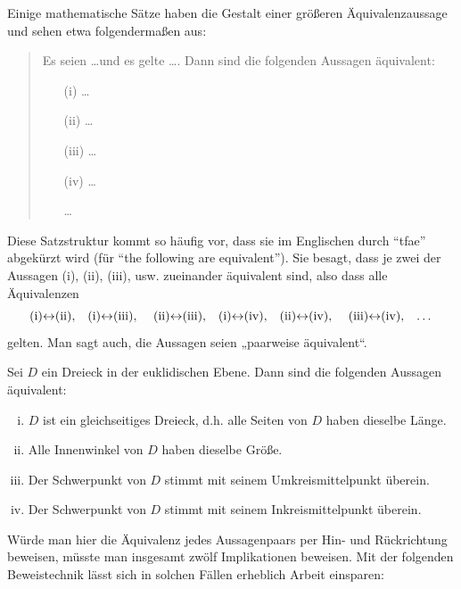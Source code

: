 \begin{de} \label{def:tfae}
    Einige mathematische Sätze haben die Gestalt einer größeren Äquivalenzaussage und sehen etwa folgendermaßen aus:
    \begin{quote}
        Es seien \dots und es gelte \dots. Dann sind die folgenden Aussagen äquivalent:
        \begin{itemize}
            \item[(i)] \dots
            \item[(ii)] \dots
            \item[(iii)] \dots
            \item[(iv)] \dots
            \item[\dots]
        \end{itemize}
    \end{quote}
    Diese Satzstruktur kommt so häufig vor, dass sie im Englischen durch ``tfae'' abgekürzt wird (für ``the following are equivalent''). Sie besagt, dass je zwei der Aussagen (i), (ii), (iii), usw. zueinander äquivalent sind, also dass alle Äquivalenzen
        \[ \text{(i)$\leftrightarrow$(ii),\quad (i)$\leftrightarrow$(iii), \quad (ii)$\leftrightarrow$(iii),\quad (i)$\leftrightarrow$(iv),\quad (ii)$\leftrightarrow$(iv), \quad (iii)$\leftrightarrow$(iv),\quad \dots} \]
    gelten. Man sagt auch, die Aussagen seien „paarweise äquivalent“.
 \end{de}
 
 
\begin{bsp}
    Sei $D$ ein Dreieck in der euklidischen Ebene. Dann sind die folgenden Aussagen äquivalent:
    \begin{enumerate}[(i)]
        \item $D$ ist ein gleichseitiges Dreieck, d.h. alle Seiten von $D$ haben dieselbe Länge.
        \item Alle Innenwinkel von $D$ haben dieselbe Größe.
        \item Der Schwerpunkt von $D$ stimmt mit seinem Umkreismittelpunkt überein.
        \item Der Schwerpunkt von $D$ stimmt mit seinem Inkreismittelpunkt überein.
    \end{enumerate}
Würde man hier die Äquivalenz jedes Aussagenpaars per Hin- und Rückrichtung beweisen, müsste man insgesamt zwölf Implikationen beweisen. Mit der folgenden Beweistechnik lässt sich in solchen Fällen erheblich Arbeit einsparen:
\end{bsp}


